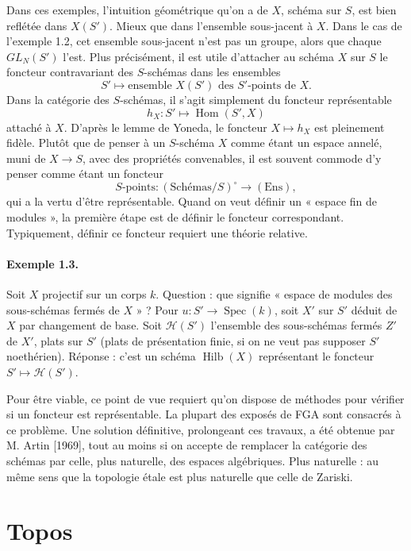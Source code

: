 \documentclass[11pt]{article}
\begin{document}
Dans ces exemples, l'intuition géométrique qu'on a de \(X\), schéma sur \(S\), est bien reflétée dans \(X(S')\). Mieux que dans l'ensemble sous-jacent à \(X\). Dans le cas de l'exemple 1.2, cet ensemble sous-jacent n'est pas un groupe, alors que chaque \(GL_N(S')\) l'est. Plus précisément, il est utile d'attacher au schéma \(X\) sur \(S\) le foncteur contravariant des \(S\)-schémas dans les ensembles
\[
  S' \longmapsto \text{ensemble } X(S') \text{ des } S'\text{-points de } X.
\]
Dans la catégorie des \(S\)-schémas, il s'agit simplement du foncteur représentable
\[
  h_X:S'\longmapsto \operatorname{Hom}(S',X)
\]
attaché à \(X\). D'après le lemme de Yoneda, le foncteur \(X\mapsto h_X\) est pleinement fidèle. Plutôt que de penser à un \(S\)-schéma \(X\) comme étant un espace annelé, muni de \(X\to S\), avec des propriétés convenables, il est souvent commode d'y penser comme étant un foncteur
\[
  \text{\(S\)-points}:(\text{Schémas}/S)^\circ\longrightarrow(\text{Ens}),
\]
qui a la vertu d'être représentable. Quand on veut définir un « espace fin de modules », la première étape est de définir le foncteur correspondant. Typiquement, définir ce foncteur requiert une théorie relative.

\paragraph{Exemple 1.3.}
Soit \(X\) projectif sur un corps \(k\). Question : que signifie « espace de modules des sous-schémas fermés de \(X\) » ? Pour \(u:S'\to\operatorname{Spec}(k)\), soit \(X'\) sur \(S'\) déduit de \(X\) par changement de base. Soit \(\mathcal H(S')\) l'ensemble des sous-schémas fermés \(Z'\) de \(X'\), plats sur \(S'\) (plats de présentation finie, si on ne veut pas supposer \(S'\) noethérien). Réponse : c'est un schéma \(\operatorname{Hilb}(X)\) représentant le foncteur \(S'\mapsto\mathcal H(S')\).

Pour être viable, ce point de vue requiert qu'on dispose de méthodes pour vérifier si un foncteur est représentable. La plupart des exposés de FGA sont consacrés à ce problème. Une solution définitive, prolongeant ces travaux, a été obtenue par M. Artin [1969], tout au moins si on accepte de remplacer la catégorie des schémas par celle, plus naturelle, des espaces algébriques. Plus naturelle : au même sens que la topologie étale est plus naturelle que celle de Zariski.

\section{Topos}
\end{document}
